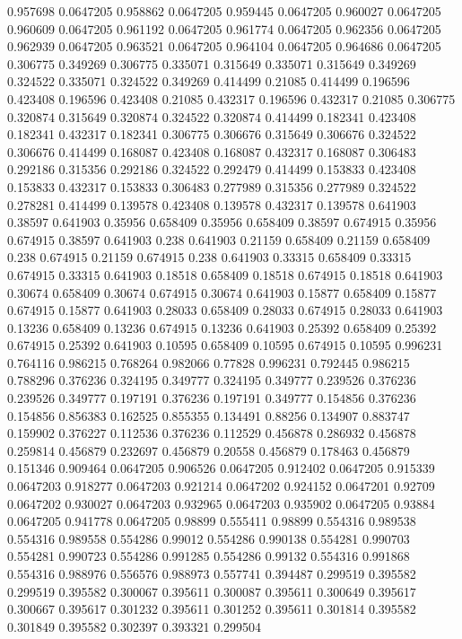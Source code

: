 0.957698 0.0647205
0.958862 0.0647205
0.959445 0.0647205
0.960027 0.0647205
0.960609 0.0647205
0.961192 0.0647205
0.961774 0.0647205
0.962356 0.0647205
0.962939 0.0647205
0.963521 0.0647205
0.964104 0.0647205
0.964686 0.0647205
0.306775 0.349269
0.306775 0.335071
0.315649 0.335071
0.315649 0.349269
0.324522 0.335071
0.324522 0.349269
0.414499 0.21085
0.414499 0.196596
0.423408 0.196596
0.423408 0.21085
0.432317 0.196596
0.432317 0.21085
0.306775 0.320874
0.315649 0.320874
0.324522 0.320874
0.414499 0.182341
0.423408 0.182341
0.432317 0.182341
0.306775 0.306676
0.315649 0.306676
0.324522 0.306676
0.414499 0.168087
0.423408 0.168087
0.432317 0.168087
0.306483 0.292186
0.315356 0.292186
0.324522 0.292479
0.414499 0.153833
0.423408 0.153833
0.432317 0.153833
0.306483 0.277989
0.315356 0.277989
0.324522 0.278281
0.414499 0.139578
0.423408 0.139578
0.432317 0.139578
0.641903 0.38597
0.641903 0.35956
0.658409 0.35956
0.658409 0.38597
0.674915 0.35956
0.674915 0.38597
0.641903 0.238
0.641903 0.21159
0.658409 0.21159
0.658409 0.238
0.674915 0.21159
0.674915 0.238
0.641903 0.33315
0.658409 0.33315
0.674915 0.33315
0.641903 0.18518
0.658409 0.18518
0.674915 0.18518
0.641903 0.30674
0.658409 0.30674
0.674915 0.30674
0.641903 0.15877
0.658409 0.15877
0.674915 0.15877
0.641903 0.28033
0.658409 0.28033
0.674915 0.28033
0.641903 0.13236
0.658409 0.13236
0.674915 0.13236
0.641903 0.25392
0.658409 0.25392
0.674915 0.25392
0.641903 0.10595
0.658409 0.10595
0.674915 0.10595
0.996231 0.764116
0.986215 0.768264
0.982066 0.77828
0.996231 0.792445
0.986215 0.788296
0.376236 0.324195
0.349777 0.324195
0.349777 0.239526
0.376236 0.239526
0.349777 0.197191
0.376236 0.197191
0.349777 0.154856
0.376236 0.154856
0.856383 0.162525
0.855355 0.134491
0.88256 0.134907
0.883747 0.159902
0.376227 0.112536
0.376236 0.112529
0.456878 0.286932
0.456878 0.259814
0.456879 0.232697
0.456879 0.20558
0.456879 0.178463
0.456879 0.151346
0.909464 0.0647205
0.906526 0.0647205
0.912402 0.0647205
0.915339 0.0647203
0.918277 0.0647203
0.921214 0.0647202
0.924152 0.0647201
0.92709 0.0647202
0.930027 0.0647203
0.932965 0.0647203
0.935902 0.0647205
0.93884 0.0647205
0.941778 0.0647205
0.98899 0.555411
0.98899 0.554316
0.989538 0.554316
0.989558 0.554286
0.99012 0.554286
0.990138 0.554281
0.990703 0.554281
0.990723 0.554286
0.991285 0.554286
0.99132 0.554316
0.991868 0.554316
0.988976 0.556576
0.988973 0.557741
0.394487 0.299519
0.395582 0.299519
0.395582 0.300067
0.395611 0.300087
0.395611 0.300649
0.395617 0.300667
0.395617 0.301232
0.395611 0.301252
0.395611 0.301814
0.395582 0.301849
0.395582 0.302397
0.393321 0.299504
